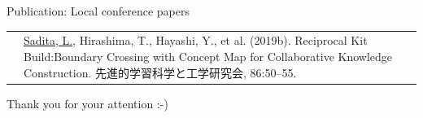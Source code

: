 \begin{frame}{Publication: Local conference papers}
\begin{tabular}{p{15mm}p{80mm}}
    \tiny{\color{blue}{ALST 2019}} &\underline{Sadita, L.}, Hirashima, T., Hayashi, Y., et al. (2019b). Reciprocal Kit Build:Boundary Crossing with Concept Map for Collaborative Knowledge Construction. 先進的学習科学と工学研究会, 86:50–55.
\end{tabular}
\end{frame}



\begin{frame}{}
    Thank you for your attention :-)
\end{frame}

